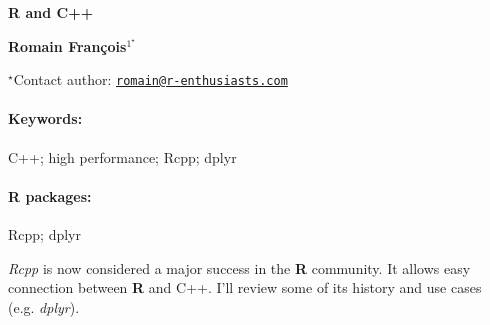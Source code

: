 \documentclass[11pt, a4paper]{article}
\renewcommand{\title}[1]{\begin{center}{\bf \LARGE #1}\end{center}}
\newcommand{\keywords}{\paragraph{Keywords:}}
\newcommand{\packages}{\paragraph{R packages:}}
\begin{document}
\pagestyle{empty}

\title{R and C++}

\begin{center}
  {\bf Romain François$^{1^\star}$}
\end{center}

\vskip 0.3cm

\begin{affiliations}
$^\star$Contact author: \href{mailto:romain@r-enthusiasts.com}{\nolinkurl{romain@r-enthusiasts.com}}\\
\end{affiliations}

\vskip 0.5cm

\begin{minipage}{0.915\textwidth}
\keywords C++; high performance; Rcpp; dplyr
\packages Rcpp; dplyr
\end{minipage}

\vskip 0.8cm

\emph{Rcpp} is now considered a major success in the \textbf{R}
community. It allows easy connection between \textbf{R} and C++. I'll
review some of its history and use cases (e.g. \emph{dplyr}).
\end{document}
